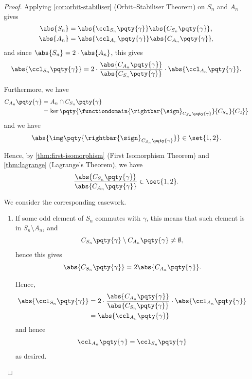 \begin{proof}
    Applying \autoref{cor:orbit-stabiliser} (Orbit--Stabiliser Theorem) on \(S_n\) and \(A_n\) gives
    \begin{align*}
        \abs{S_n} &= \abs{\ccl_{S_n} \pqty{\gamma}} \abs{C_{S_n} \pqty{\gamma}}, \\
        \abs{A_n} &= \abs{\ccl_{A_n} \pqty{\gamma}} \abs{C_{A_n} \pqty{\gamma}},
    \end{align*}
    and since \(\abs{S_n} = 2 \cdot \abs{A_n}\), this gives
    \[
        \abs{\ccl_{S_n} \pqty{\gamma}} = 2 \cdot \frac{\abs{C_{A_n} \pqty{\gamma}}}{\abs{C_{S_n} \pqty{\gamma}}} \cdot \abs{\ccl_{A_n} \pqty{\gamma}}.
    \]

    Furthermore, we have
    \begin{align*}
        C_{A_n} \pqty{\gamma} &= A_n \cap C_{S_n} \pqty{\gamma} \\
        &= \ker\pqty{\functiondomain{\rightbar{\sign}_{C_{S_n} \pqty{\gamma}}}{C_{S_n}}{C_2}}
    \end{align*}
    and we have
    \[
        \abs{\img\pqty{\rightbar{\sign}_{C_{S_n}\pqty{\gamma}}}} \in \set{1, 2}.
    \]

    Hence, by \autoref{thm:first-isomorphism} (First Isomorphism Theorem) and \autoref{thm:lagrange} (Lagrange's Theorem), we have
    \[
        \frac{\abs{C_{S_n} \pqty{\gamma}}}{\abs{C_{A_n} \pqty{\gamma}}} \in \set{1, 2}.
    \]

    We consider the corresponding casework.
    \begin{enumerate}
        \item If some odd element of \(S_n\) commutes with \(\gamma\), this means that such element is in \(S_n \setminus A_n\), and
        \[
            C_{S_n} \pqty{\gamma} \setminus C_{A_n} \pqty{\gamma} \neq \emptyset,
        \]
        hence this gives
        \[
            \abs{C_{S_n} \pqty{\gamma}} = 2 \abs{C_{A_n} \pqty{\gamma}}.
        \]

        Hence,
        \begin{align*}
            \abs{\ccl_{S_n} \pqty{\gamma}} &= 2 \cdot \frac{\abs{C_{A_n} \pqty{\gamma}}}{\abs{C_{S_n} \pqty{\gamma}}} \cdot \abs{\ccl_{A_n} \pqty{\gamma}} \\
            &= \abs{\ccl_{A_n} \pqty{\gamma}}
        \end{align*}
        and hence
        \[
            \ccl_{A_n} \pqty{\gamma} = \ccl_{S_n} \pqty{\gamma}
        \]
        as desired.


\end{enumerate}
\end{proof}
